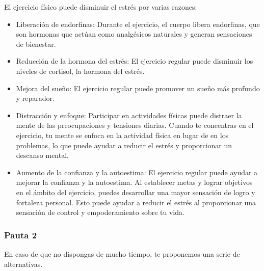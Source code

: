                 El ejercicio físico puede disminuir el estrés por varias razones:
                \begin{itemize}
                    \item Liberación de endorfinas: Durante el ejercicio, el cuerpo libera endorfinas, que son hormonas que  actúan como analgésicos naturales y generan sensaciones de bienestar. 
                    \item Reducción de la hormona del estrés: El ejercicio regular puede disminuir los niveles de  cortisol, la hormona del estrés.
                    \item Mejora del sueño: El ejercicio regular puede promover un sueño más profundo y reparador.
                    \item Distracción y enfoque: Participar en actividades físicas puede distraer la mente de las preocupaciones y tensiones diarias. Cuando te concentras en el ejercicio, tu mente se enfoca en la actividad física en lugar de en los problemas, lo que puede ayudar a reducir el estrés y proporcionar un descanso mental.
                    \item Aumento de la confianza y la autoestima: El ejercicio regular puede ayudar a mejorar la confianza y la autoestima. Al establecer metas y lograr objetivos en el ámbito del ejercicio, puedes desarrollar una mayor sensación de logro y fortaleza personal. Esto puede ayudar a reducir el estrés al 
                    proporcionar una sensación de control y empoderamiento sobre tu vida.
                \end{itemize}

            \subsubsection{Pauta 2}
                En caso de que no dispongas de mucho tiempo, te proponemos una serie de alternativas. 

